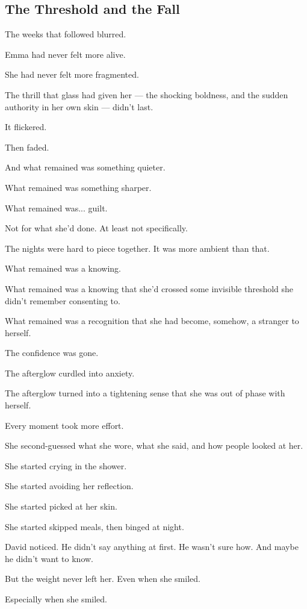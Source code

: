 
\subsection{The Threshold and the Fall}

The weeks that followed blurred.

Emma had never felt more alive.

She had never felt more fragmented. 

The thrill that glass had given her --- the shocking 
boldness, and the sudden authority in her own skin --- didn’t last.  

It flickered. 

Then faded. 

And what remained was something quieter. 

What remained was something sharper.

What remained was... guilt.

Not for what she’d done. At least not specifically. 

The nights were hard to piece together. 
It was more ambient than that. 

What remained was a knowing. 

What remained was a knowing that she'd crossed some invisible threshold she didn’t 
remember consenting to. 

What remained was a recognition that she had become, somehow, a stranger to herself.

The confidence was gone.

The afterglow curdled into anxiety. 

The afterglow turned into a tightening sense that she was 
out of phase with herself. 

Every moment took more effort. 

She second-guessed what she wore, what she said, and how people looked at her. 

She started crying in the shower. 

She started avoiding her reflection. 

She started picked at her skin. 

She started skipped meals, then binged at night. 

David noticed. He didn’t say anything at first. He wasn’t sure how. And maybe he didn’t want to know. 

But the weight never left her. Even when she smiled.

Especially when she smiled.

